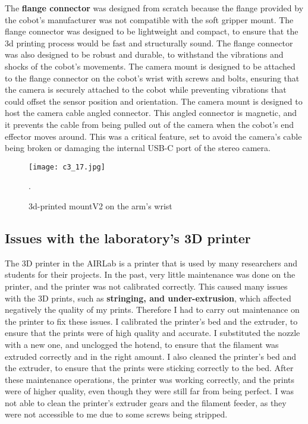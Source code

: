 The \textbf{flange connector} was designed from scratch because the flange provided by the cobot's manufacturer was not
compatible with the soft gripper mount. The flange connector was designed to be lightweight and compact, 
to ensure that the 3d printing process would be fast and structurally sound. The flange connector was also designed
to be robust and durable, to withstand the vibrations and shocks of the cobot's movements.
The camera mount is designed to be attached to the flange connector on the cobot's wrist with screws and bolts,
ensuring that the camera is securely attached to the cobot while preventing vibrations that could
offset the sensor position and orientation. The camera mount is designed to host the camera cable angled connector.
This angled connector is magnetic, and it prevents the cable from being pulled out of the camera when
the cobot's end effector moves around. This was a critical feature, set to avoid the camera's cable
being broken or damaging the internal USB-C port of the stereo camera.

\begin{figure}[t]
    \centering
    \texttt{[image: c3\_17.jpg]}
    \captionsetup{width=1\linewidth}
    \caption{3d-printed mountV2 on the arm's wrist}.
    \label{fig:c3_img17}
\end{figure}

\subsection{Issues with the laboratory's 3D printer}

The 3D printer in the AIRLab is a printer that is used by many researchers and students for their projects.
In the past, very little maintenance was done on the printer, and the printer was not calibrated correctly.
This caused many issues with the 3D prints, such as \textbf{stringing, and under-extrusion}, which affected negatively 
the quality of my prints. Therefore I had to carry out maintenance on the printer to fix these issues.
I calibrated the printer's bed and the extruder, to ensure that the prints were of high quality and accurate.
I substituted the nozzle with a new one, and unclogged the hotend, to ensure that the filament was extruded correctly
and in the right amount. I also cleaned the printer's bed and the extruder, to ensure that the prints were sticking
correctly to the bed. After these maintenance operations, the printer was working correctly, and the prints were of
higher quality, even though they were still far from being perfect. I was not able to clean the printer's
extruder gears and the filament feeder, as they were not accessible to me due to some screws being stripped.

